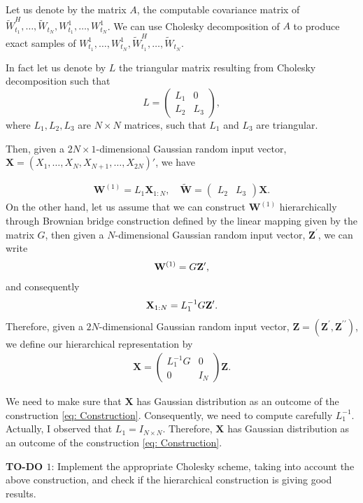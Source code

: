 Let us denote by the matrix $A$, the computable covariance matrix of  $ \widetilde{W}^H_{t_1},\dots, \widetilde{W}_{t_N},W^1_{t_1},\dots, W^1_{t_N}$.  We can use Cholesky decomposition of $A$ to produce exact samples of $W^1_{t_1},\dots, W^1_{t_N}, \widetilde{W}^H_{t_1},\dots, \widetilde{W}_{t_N}$.

In fact let us denote by $L$ the triangular matrix resulting from Cholesky decomposition such that 
\[
L=
\left(
\begin{array}{c|c}
L_1& 0 \\
L_2 & L_3
\end{array}
\right),
\]
where $L_1, L_2,L_3$ are $N \times N$ matrices, such that $L_1$ and $L_3$ are triangular.

Then, given  a $2 N \times 1$-dimensional Gaussian random input vector, $\mathbf{X}=(X_1, \dots,X_N, X_{N+1}, \dots, X_{2N})'$, we have

\begin{align}
\mathbf{W}^{(1)}=L_1 \mathbf{X}_{1:N}, \quad \widetilde{\mathbf{W}}= 
\left(
\begin{array}{c|c}
L_2 & L_3 
\end{array}
\right) \mathbf{X}.
\end{align}
On the other hand, let us assume that we can construct $\mathbf{W}^{(1)}$ hierarchically  through  Brownian bridge construction defined by the linear mapping given by the matrix $G$, then given a $ N$-dimensional Gaussian random input vector, $\mathbf{Z}^\prime$, we can write
\begin{align*}
\mathbf{W}^{(1)}=G  \mathbf{Z}^\prime ,
\end{align*}
and consequently
\begin{align*}
 \mathbf{X}_{1:N}= L_1^{-1} G  \mathbf{Z}^\prime .
\end{align*}
Therefore, given a $2 N$-dimensional Gaussian random input vector, $\mathbf{Z}=(\mathbf{Z}^\prime,\mathbf{Z}^{\prime \prime})$, we define our hierarchical representation by
\begin{align}\label{eq: Construction}
\mathbf{X}=\left(
\begin{array}{c|c}
L_1^{-1} G & 0\\
0 & I_{N} 
\end{array}
\right) \mathbf{Z}.
\end{align}

We need to make sure that $\mathbf{X}$  has Gaussian distribution as an outcome of the construction \eqref{eq: Construction}. Consequently, we need to compute carefully $L_1^{-1}$. Actually, I observed that $L_1=I_{N \times N}.$ Therefore,  $\mathbf{X}$  has Gaussian distribution as an outcome of the construction \eqref{eq: Construction}.



\textbf{TO-DO $1$}: Implement the appropriate Cholesky scheme, taking into account the above construction, and check if the hierarchical construction is giving good results.

